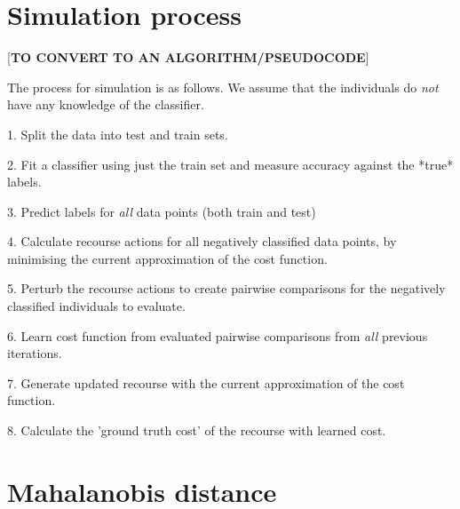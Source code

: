 \section{Simulation process}

[\textbf{TO CONVERT TO AN ALGORITHM/PSEUDOCODE}]

The process for simulation is as follows. We assume that the individuals do \textit{not} have any knowledge of the classifier.

1. Split the data into test and train sets.

2. Fit a classifier using just the train set and measure accuracy against the *true* labels.

3. Predict labels for \textit{all} data points (both train and test)

4. Calculate recourse actions for all negatively classified data points, by minimising the current approximation of the cost function.

5. Perturb the recourse actions to create pairwise comparisons for the negatively classified individuals to evaluate.

6. Learn cost function from evaluated pairwise comparisons from \textit{all} previous iterations.

7. Generate updated recourse with the current approximation of the cost function.

8. Calculate the 'ground truth cost' of the recourse with learned cost.

\section{Mahalanobis distance}

